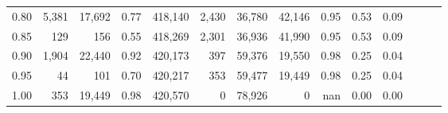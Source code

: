 \begin{tabular}{rrrrrrrrrrrrrr}
0.80 &   5,381 &  17,692 &  0.77 &  418,140 &    2,430 &  36,780 &  42,146 &  0.95 &  0.53 &      0.09 \\
0.85 &     129 &     156 &  0.55 &  418,269 &    2,301 &  36,936 &  41,990 &  0.95 &  0.53 &      0.09 \\
0.90 &   1,904 &  22,440 &  0.92 &  420,173 &      397 &  59,376 &  19,550 &  0.98 &  0.25 &      0.04 \\
0.95 &      44 &     101 &  0.70 &  420,217 &      353 &  59,477 &  19,449 &  0.98 &  0.25 &      0.04 \\
1.00 &     353 &  19,449 &  0.98 &  420,570 &        0 &  78,926 &       0 &   nan &  0.00 &      0.00 \\
\bottomrule
\end{tabular}
